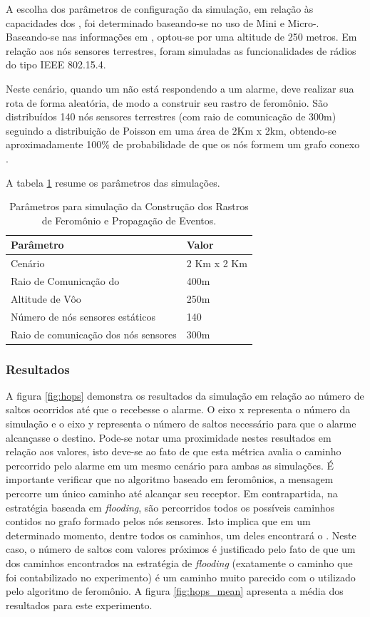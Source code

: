 A escolha dos parâmetros de configuração da simulação, em relação às capacidades dos \vants, foi determinado baseando-se no uso de Mini e Micro-\vants. Baseando-se nas informações em \cite{uas_2009,Storvold2009}, optou-se por uma altitude de 250 metros. Em relação aos nós sensores terrestres, foram simuladas as funcionalidades de rádios do tipo IEEE 802.15.4.

Neste cenário, quando um \vant não está respondendo a um alarme, deve realizar sua rota de forma aleatória, de modo a construir seu rastro de feromônio. São distribuídos 140 nós sensores terrestres (com raio de comunicação de 300m) seguindo a distribuição de Poisson em uma área de 2Km x 2km, obtendo-se aproximadamente 100\% de probabilidade de que os nós formem um grafo conexo \cite{Bettstetter2002}.

A tabela \ref{tbl:setup} resume os parâmetros das simulações.

\begin{table}[h!]
\centering
	\begin{tabular}{| l | l |}
		\hline
		Parâmetro & Valor \\
		\hline
		Cenário & 2 Km x 2 Km\\
		Raio de Comunicação do \vant & 400m\\
		Altitude de Vôo & 250m  \\
		Número de nós sensores estáticos & 140  \\
		Raio de comunicação dos nós sensores & 300m \\
		\hline
	\end{tabular}

	\caption{Parâmetros para simulação da Construção dos Rastros de Feromônio e Propagação de Eventos.}
	\label{tbl:setup}
\end{table}


\subsubsection{Resultados}

 A figura \ref{fig:hops} demonstra os resultados da simulação em relação ao número de saltos ocorridos até que o \vant recebesse o alarme. O eixo x representa o número da simulação e o eixo y representa o número de saltos necessário para que o alarme alcançasse o destino. Pode-se notar uma proximidade nestes resultados em relação aos valores, isto deve-se ao fato de que esta métrica avalia o caminho percorrido pelo alarme em um mesmo cenário para ambas as simulações. É importante verificar que no algoritmo baseado em feromônios, a mensagem percorre um único caminho até alcançar seu receptor. Em contrapartida, na estratégia baseada em \emph{flooding}, são percorridos todos os possíveis caminhos contidos no grafo formado pelos nós sensores. Isto implica que em um determinado momento, dentre todos os caminhos, um deles encontrará o \vant. Neste caso, o número de saltos com valores próximos é justificado pelo fato de que um dos caminhos encontrados na estratégia de \emph{flooding} (exatamente o caminho que foi contabilizado no experimento) é um caminho muito parecido com o utilizado pelo algoritmo de feromônio. A figura \ref{fig:hops_mean} apresenta a média dos resultados para este experimento.


